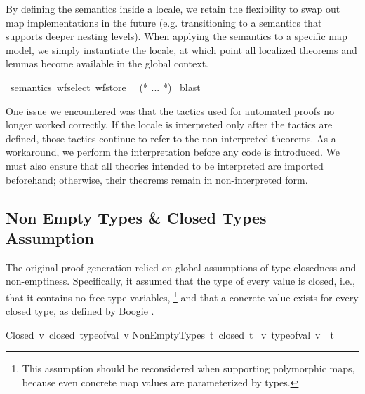 By defining the semantics inside a locale,
we retain the flexibility to swap out map implementations in the future
(e.g. transitioning to a semantics that supports deeper nesting levels).
When applying the semantics to a specific map model, we simply instantiate the locale,
at which point all localized theorems and lemmas become available in the global context.

\begin{isabellebody}\isanewline
{}\isamarkupfalse%
\ semantics\ wf{\isacharunderscore}{\kern0pt}select\ wf{\isacharunderscore}{\kern0pt}store\ {}\isanewline
{}\ (* ... *) \isamarkupfalse%
\ blast%
\end{isabellebody}

One issue we encountered was that the  tactics used for automated proofs no longer worked correctly.
If the locale is interpreted only after the  tactics are defined, those tactics continue to refer to the non-interpreted theorems.
As a workaround, we perform the interpretation before any  code is introduced.
We must also ensure that all theories intended to be interpreted are imported beforehand;
otherwise, their theorems remain in non-interpreted form.


\subsection{Non Empty Types \& Closed Types Assumption}
\label{sec:non-empty-types}

The original proof generation relied on global assumptions of type closedness and non-emptiness.
Specifically, it assumed that the type of every value is closed, i.e., that it contains no free type variables,
\footnote{This assumption should be reconsidered when supporting polymorphic maps,
because even concrete map values are parameterized by types.}
and that a concrete value exists for every closed type,
as defined by Boogie \cite{leino2008boogie}.

\begin{isabellebody}\isanewline
Closed{\isacharcolon}{\kern0pt}\ {\isachardoublequoteopen}{\kern0pt}{\isasymAnd}{\kern0pt}v{\isachardot}{\kern0pt}\ closed\ {\isacharparenleft}{\kern0pt}type{\isacharunderscore}{\kern0pt}of{\isacharunderscore}{\kern0pt}val\ v{\isacharparenright}{\kern0pt}{\isachardoublequoteclose}\isanewline
NonEmptyTypes{\isacharcolon}{\kern0pt}\ {\isachardoublequoteopen}{\isasymAnd}t{\isachardot}{\kern0pt}\ {\isacharparenleft}{\kern0pt}{\isacharparenleft}{\kern0pt}closed\ t{\isacharparenright}{\kern0pt}
{\isasymLongrightarrow}\ {\isacharparenleft}{\kern0pt}{\isasymexists}v{\isachardot}{\kern0pt}\ type{\isacharunderscore}{\kern0pt}of{\isacharunderscore}{\kern0pt}val\ v\ {\isacharequal}{\kern0pt}\ t{\isacharparenright}{\kern0pt}{\isacharparenright}{\kern0pt}{\isachardoublequoteclose}\ \isanewline
\end{isabellebody}

